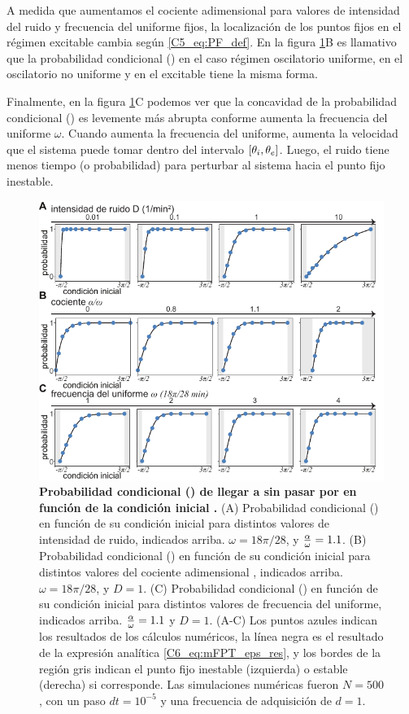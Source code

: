 \documentclass[./main.tex]{subfiles}
\begin{document}
A medida que aumentamos el cociente adimensional \ddelta para valores de intensidad del ruido y frecuencia del uniforme fijos, la localización de los puntos fijos en el régimen excitable cambia según \ref{C5_eq:PF_def}. En la figura \ref{C6_fig:mFPT_eps}B es llamativo que la probabilidad condicional \epsplus(\xx) en el caso régimen oscilatorio uniforme, en el oscilatorio no uniforme y en el excitable tiene la misma forma. 

Finalmente, en la figura  \ref{C6_fig:mFPT_eps}C podemos ver que la concavidad de la probabilidad condicional \epsplus(\xx) es levemente más abrupta conforme aumenta la frecuencia del uniforme $\omega$.  Cuando aumenta la frecuencia del uniforme, aumenta la velocidad que el sistema puede tomar dentro del intervalo $[\theta_i,\theta_e]$. Luego, el ruido tiene menos tiempo (o probabilidad) para perturbar al sistema hacia el punto fijo inestable. 


\begin{figure}
    \centering
    \includegraphics[width=1\columnwidth]{figures/chapter6/C6_eps_plus.pdf} 
    \caption{\textbf{Probabilidad condicional \epsplus(\xx) de llegar a \xxe sin pasar por \xxi en función de la condición inicial \xx.} (A) Probabilidad condicional \epsplus(\xx) en función de su condición inicial \xx para distintos valores de intensidad de ruido, indicados arriba. $\omega = 18\pi/28$, y $\frac{\alpha}{\omega} = 1.1$. (B) Probabilidad condicional \epsplus(\xx) en función de su condición inicial \xx para distintos valores del cociente adimensional \ddelta, indicados arriba. $\omega = 18\pi/28$, y $D = 1$. (C) Probabilidad condicional \epsplus(\xx) en función de su condición inicial \xx para distintos valores de frecuencia del uniforme, indicados arriba. $\frac{\alpha}{\omega} = 1.1$ y $D=1$. (A-C) Los puntos azules indican los resultados de los cálculos numéricos, la línea negra es el resultado de la expresión analítica \ref{C6_eq:mFPT_eps_res}, y los bordes de la región gris indican el punto fijo inestable (izquierda) o estable (derecha) si corresponde. Las simulaciones numéricas fueron $N=500$, con un paso $dt = 10^{-5}$ y una frecuencia de adquisición de $d=1$.}
    \label{C6_fig:mFPT_eps}
\end{figure}
\end{document}
